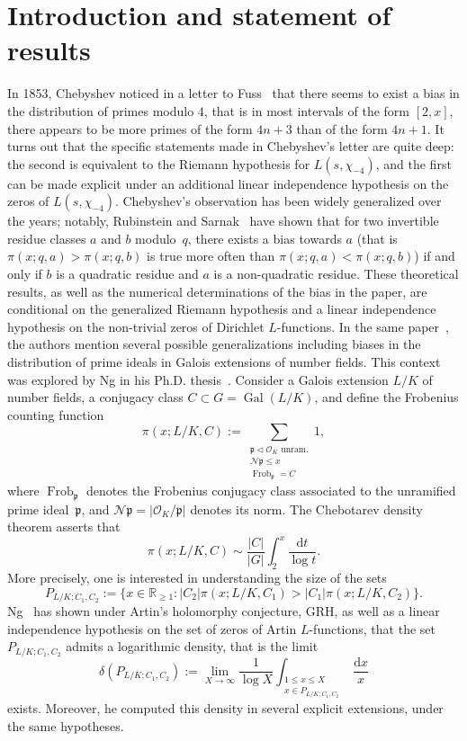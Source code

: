 \documentclass[JEP,XML,SOM,Unicode,NoEqCountersInSection,NoFloatCountersInSection,published]{cedram}
\let\mathcal\mathscr
\DeclareMathOperator{\Frob}{Frob}
\theoremstyle{definition}
\DeclareMathOperator{\Gal}{Gal}
\renewcommand{\d}{\mathrm{d}}
\begin{document}
\maketitle
\tableofcontents
\mainmatter

\section{Introduction and statement of results}
\label{section intro}

In 1853, Chebyshev noticed in a letter to Fuss~\cite{Ch} that there seems to exist a bias in the distribution of primes modulo $4$, that is in most intervals of the form $[2,x]$, there appears to be more primes of the form $4n+3$ than of the form $4n+1$.
It turns out that the specific statements made in Chebyshev's letter are quite deep: the second is equivalent to the Riemann hypothesis for $L(s,\chi_{-4})$, and the first can be made explicit under an additional linear independence hypothesis on the zeros of $L(s,\chi_{-4})$.
Chebyshev's observation has been widely generalized over the years; notably, Rubinstein and Sarnak~\cite{RS} have shown that for two invertible residue classes $a$ and $b$ modulo~$q$, there exists a bias towards $a$ (that is $\pi(x;q,a)>\pi(x;q,b)$ is true more often than $\pi(x;q,a)<\pi(x;q,b)$) if and only if $b$ is a quadratic residue and $a$ is a non-quadratic residue. These theoretical results, as well as the numerical determinations of the bias in the paper, are conditional on the generalized Riemann hypothesis and a linear independence hypothesis on the non-trivial zeros of Dirichlet $L$-functions. In the same paper~\cite[\S 5]{RS}, the authors mention several possible generalizations including biases in the distribution of prime ideals in Galois extensions of number fields. This context was explored by Ng in his Ph.D. thesis~\cite{Ng}.
Consider a Galois extension $L/K$ of number fields, a conjugacy class $C\subset G= \Gal(L/K)$, and define the Frobenius counting function
\[ \pi(x;L/K,C):=\sum_{\substack{\mathfrak p\triangleleft \mathcal O_K \text{ unram.}\\ \mathcal N\mathfrak p \leq x \\ \Frob_\mathfrak p =C}} 1, \]
where $\Frob_\mathfrak p$ denotes the Frobenius conjugacy class associated to the unramified prime ideal~$\mathfrak p$, and $\mathcal N\mathfrak p= | \mathcal O_K/\mathfrak p|$ denotes its norm.
The Chebotarev density theorem asserts that
\[
\pi(x;L/K,C)\sim \frac{|C|}{|G|} \int_2^x \frac{\d t}{\log t}.
\]
More precisely, one is interested in understanding the size of the sets
\[P_{L/K;C_1,C_2}:=\{ x \in \mathbb R_{\geq 1}\colon |C_2|\pi(x;L/K,C_1) > |C_1|\pi(x;L/K,C_2)\}. \]
Ng~\cite{Ng} has shown under Artin's holomorphy conjecture, GRH, as well as a linear independence hypothesis on the set of zeros of Artin $L$-functions, that the set $P_{L/K;C_1,C_2}$ admits a logarithmic density, that is the limit
\[ \delta(P_{L/K;C_1,C_2}):= \lim_{X\to \infty} \frac 1{\log X} \int_{\substack{ 1\leq x \leq X\\ x\in P_{L/K;C_1,C_2}}} \frac{\d x }{x}\]
exists. Moreover, he computed this density in several explicit extensions, under the same hypotheses.
\end{document}
